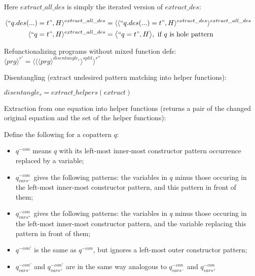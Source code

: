 \documentclass[11pt]{article} %
\begin{document}
Here $extract\_all\_des$ is simply the iterated version of $extract\_des$:

\begin{alignat*}{2}
\langle `` q.des(...) = t ", H \rangle^{extract\_all\_des} & = \langle \langle `` q.des(...) = t ", H \rangle^{extract\_des} \rangle^{extract\_all\_des} \\
\langle `` q = t ", H \rangle^{extract\_all\_des} & = \big\langle `` q = t ", H \big\rangle, \textrm{ if $q$ is hole pattern}
\end{alignat*}

Refunctionalizing programs without mixed function defs: $\langle prg \rangle^{r'} = \langle \langle \langle prg \rangle^{disentangle_r} \rangle^{split} \rangle^{r''}$

Disentangling (extract undesired pattern matching into helper functions):

$disentangle_r = extract\_helpers(extract)$

Extraction from one equation into helper functions (returns a pair of the changed original equation and the set of the helper functions):

Define the following for a copattern $q$:

\begin{itemize}
\item $q^{-con}$ means $q$ with its left-most inner-most constructor pattern occurrence replaced by a variable;
\item $q^{-con}_{vars^-}$ gives the following patterns: the variables in $q$ minus those occuring in the left-most inner-most constructor pattern, and this pattern in front of them;
\item $q^{-con}_{vars^+}$ gives the following patterns: the variables in $q$ minus those occuring in the left-most inner-most constructor pattern, and the variable replacing this pattern in front of them;
\item $q^{-con'}$ is the same as $q^{-con}$, but ignores a left-most outer constructor pattern;
\item $q^{-con'}_{vars^-}$ and $q^{-con'}_{vars^+}$ are in the same way analogous to $q^{-con}_{vars^-}$ and $q^{-con}_{vars^+}$
\end{itemize}
\end{document}

